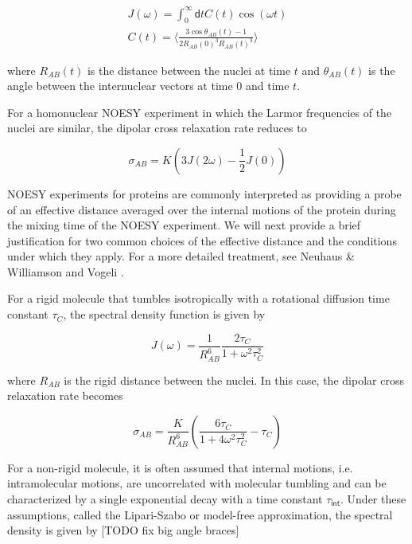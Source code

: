\documentclass[9pt,review]{livecoms}
\begin{document}
\begin{equation}
\label{eqn:noe_spectral_density}
\begin{gathered}
J(\omega) = \int_0^\infty \mathsf{d}t C(t) \cos (\omega t) \\
C(t) = \langle \frac {3 \cos \theta_{AB}(t) - 1} {2 R_{AB}(0)^3 R_{AB}(t)^3} \rangle
\end{gathered}
\end{equation}

\noindent where $R_{AB}(t)$ is the distance between the nuclei at time $t$ and $\theta_{AB}(t)$ is the angle between the internuclear vectors at time $0$ and time $t$.

For a homonuclear NOESY experiment in which the Larmor frequencies of the nuclei are similar, the dipolar cross relaxation rate reduces to

\begin{equation}
\label{eqn:noe_homonuclear}
\sigma_{AB} = K \left( 3 J(2 \omega) - \frac {1} {2} J(0) \right)
\end{equation}

\noindent NOESY experiments for proteins are commonly interpreted as providing a probe of an effective distance averaged over the internal motions of the protein during the mixing time of the NOESY experiment.
We will next provide a brief justification for two common choices of the effective distance and the conditions under which they apply.
For a more detailed treatment, see Neuhaus \& Williamson \cite{neuhaus_nuclear_2000} and Vogeli \cite{vogeli_nuclear_2014}.

For a rigid molecule that tumbles isotropically with a rotational diffusion time constant $\tau_C$, the spectral density function is given by

\begin{equation}
\label{eqn:noe_rigid_spectral_density}
J(\omega) = \frac {1} {R_{AB}^6} \frac {2 \tau_C} {1 + \omega^2 \tau_C^2}
\end{equation}

\noindent where $R_{AB}$ is the rigid distance between the nuclei. In this case, the dipolar cross relaxation rate becomes

\begin{equation}
\label{eqn:noe_rigid_cross_relaxation}
\sigma_{AB} = \frac {K} {R_{AB}^6} \left( \frac {6 \tau_C} {1 + 4 \omega^2 \tau_C^2} - \tau_C \right)
\end{equation}

For a non-rigid molecule, it is often assumed that internal motions, i.e. intramolecular motions, are uncorrelated with molecular tumbling and can be characterized by a single exponential decay with a time constant $\tau_{\mathsf{int}}$.
Under these assumptions, called the Lipari-Szabo or model-free approximation, the spectral density is given by [TODO fix big angle braces]
\end{document}
